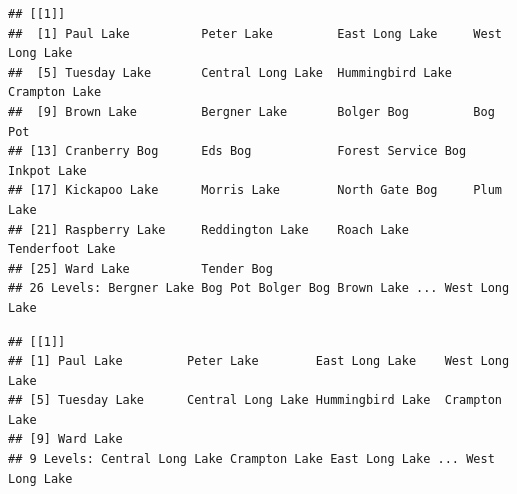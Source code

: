 \documentclass[12pt,]{article}
\newenvironment{Shaded}{\begin{snugshade}}{\end{snugshade}}
\newcommand{\CommentTok}[1]{\textcolor[rgb]{0.56,0.35,0.01}{\textit{#1}}}
\newcommand{\KeywordTok}[1]{\textcolor[rgb]{0.13,0.29,0.53}{\textbf{#1}}}
\newcommand{\NormalTok}[1]{#1}
\newcommand{\OperatorTok}[1]{\textcolor[rgb]{0.81,0.36,0.00}{\textbf{#1}}}
\begin{document}
\begin{verbatim}
## [[1]]
##  [1] Paul Lake          Peter Lake         East Long Lake     West Long Lake    
##  [5] Tuesday Lake       Central Long Lake  Hummingbird Lake   Crampton Lake     
##  [9] Brown Lake         Bergner Lake       Bolger Bog         Bog Pot           
## [13] Cranberry Bog      Eds Bog            Forest Service Bog Inkpot Lake       
## [17] Kickapoo Lake      Morris Lake        North Gate Bog     Plum Lake         
## [21] Raspberry Lake     Reddington Lake    Roach Lake         Tenderfoot Lake   
## [25] Ward Lake          Tender Bog        
## 26 Levels: Bergner Lake Bog Pot Bolger Bog Brown Lake ... West Long Lake
\end{verbatim}

\begin{Shaded}
\end{Shaded}

\begin{verbatim}
## [[1]]
## [1] Paul Lake         Peter Lake        East Long Lake    West Long Lake   
## [5] Tuesday Lake      Central Long Lake Hummingbird Lake  Crampton Lake    
## [9] Ward Lake        
## 9 Levels: Central Long Lake Crampton Lake East Long Lake ... West Long Lake
\end{verbatim}
\end{document}
